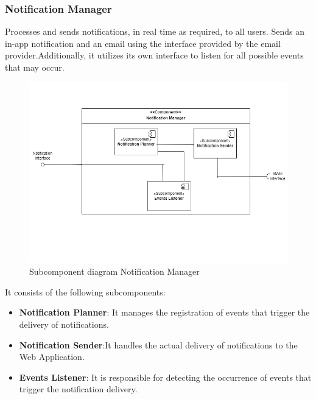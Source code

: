 \subsubsection{Notification Manager}Processes and sends notifications, in real time as required, to all users. Sends an in-app notification and an email using the interface provided by the email provider.Additionally, it utilizes its own interface to listen for all possible events that may occur.
   \begin{figure}[htbp]
    \centering
    \includegraphics[width=\linewidth]{DD/Images/Comp&Sub/NotificationManager.png}
    \caption{Subcomponent diagram Notification Manager}
    \label{fig:notification_manager}
    \end{figure}
    
It consists of the following subcomponents:
\begin{itemize}
    \item  \textbf{Notification Planner}: It manages the registration of events that trigger the delivery of notifications.
    \item  \textbf{Notification Sender}:It handles the actual delivery of notifications to the Web Application.
    \item  \textbf{Events Listener}: It is responsible for detecting the occurrence of events that trigger the notification delivery.
    \end{itemize}
 \clearpage %
